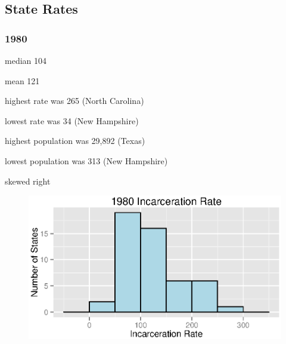 \documentclass{exam}
\begin{document}
  \pagebreak

  \subsection{State Rates}

  \subsubsection{1980}
  \begin{itemize*}
    \item median 104
    \item mean 121
    \item highest rate was 265 (North Carolina)
    \item lowest rate was 34 (New Hampshire)
    \item highest population was 29,892 (Texas)
    \item lowest population was 313 (New Hampshire)
    \item skewed right
  \end{itemize*}

  \begin{figure}[H]
    \centering
    \includegraphics[scale = 0.9]{1980_rate_histogram.eps}
  \end{figure}
\end{document}
